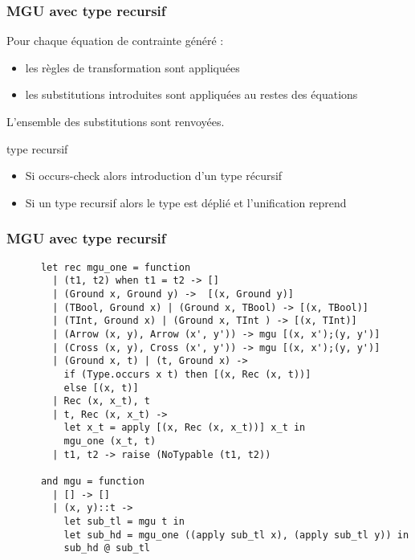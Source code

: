 \documentclass{beamer}
\begin{document}
\begin{frame}
  \frametitle{MGU avec type recursif}
  Pour chaque équation de contrainte généré :
  \begin{itemize}
  \item les règles de transformation sont appliquées
  \item les substitutions introduites sont appliquées au restes des
    équations
  \end{itemize}
  L'ensemble des substitutions sont renvoyées.
  
  type recursif 
  \begin{itemize}
  \item Si occurs-check alors introduction d'un type récursif
  \item Si un type recursif alors le type est déplié et l'unification
    reprend
  \end{itemize}
\end{frame}

\begin{frame}[fragile]
  \frametitle{MGU avec type recursif}
  \begin{mdframed}[roundcorner=20pt,backgroundcolor=gray!50]
    \begin{lstlisting}
      let rec mgu_one = function
        | (t1, t2) when t1 = t2 -> []
        | (Ground x, Ground y) ->  [(x, Ground y)]
        | (TBool, Ground x) | (Ground x, TBool) -> [(x, TBool)]
        | (TInt, Ground x) | (Ground x, TInt ) -> [(x, TInt)]
        | (Arrow (x, y), Arrow (x', y')) -> mgu [(x, x');(y, y')]
        | (Cross (x, y), Cross (x', y')) -> mgu [(x, x');(y, y')]
        | (Ground x, t) | (t, Ground x) ->
          if (Type.occurs x t) then [(x, Rec (x, t))]
          else [(x, t)]
        | Rec (x, x_t), t
        | t, Rec (x, x_t) ->
          let x_t = apply [(x, Rec (x, x_t))] x_t in
          mgu_one (x_t, t)
        | t1, t2 -> raise (NoTypable (t1, t2))

      and mgu = function
        | [] -> []
        | (x, y)::t ->
          let sub_tl = mgu t in
          let sub_hd = mgu_one ((apply sub_tl x), (apply sub_tl y)) in
          sub_hd @ sub_tl
    \end{lstlisting}
  \end{mdframed}
\end{frame} 
\end{document}
